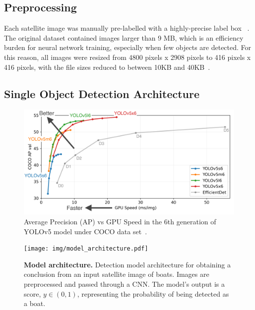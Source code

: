 \subsection{Preprocessing}
Each satellite image was manually pre-labelled with a highly-precise label box ~\cite{lutherborrowship}. The original dataset contained images larger than 9 MB, which is an efficiency burden for neural network training, especially when few objects are detected. For this reason, all images were resized from 4800 pixels x 2908 pixels to 416 pixels x 416 pixels, with the file sizes reduced to between 10KB and 40KB~\cite{nelson_2020}. 


\subsection{Single Object Detection Architecture}
\label{III-D-Detection-Architecture}

\begin{figure}[t]
    \center
    \includegraphics[width=\columnwidth]{img/YOLOv5_Performance.png}
    \caption{{Average Precision (AP) vs GPU Speed in the 6th generation of YOLOv5 model under COCO data set~\cite{glenn_jocher_2020_4154370}.}}
    \label{fig:YOLOv5_Performance}
\end{figure}

\begin{figure}[!t]
    \centering
    \texttt{[image: img/model\_architecture.pdf]}
    \caption{\textbf{Model architecture.} Detection model architecture for obtaining a conclusion from an input satellite image of boats.  Images are preprocessed and passed through a CNN. The model's output is a score, $y \in (0,1)$, representing the probability of being detected as a boat.}
    \label{model_architecture}
\end{figure}



